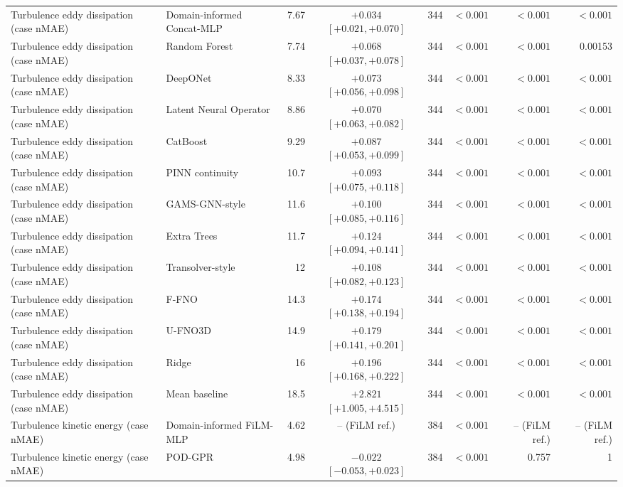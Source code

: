 \begin{landscape}
\begin{longtable}{p{4.0cm}p{3.4cm}rcrrrr}
Turbulence eddy dissipation (case nMAE) & Domain-informed Concat-MLP & 7.67 & $+0.034$ $[+0.021, +0.070]$ & 344 & $< 0.001$ & $< 0.001$ & $< 0.001$ \\
Turbulence eddy dissipation (case nMAE) & Random Forest & 7.74 & $+0.068$ $[+0.037, +0.078]$ & 344 & $< 0.001$ & $< 0.001$ & 0.00153 \\
Turbulence eddy dissipation (case nMAE) & DeepONet & 8.33 & $+0.073$ $[+0.056, +0.098]$ & 344 & $< 0.001$ & $< 0.001$ & $< 0.001$ \\
Turbulence eddy dissipation (case nMAE) & Latent Neural Operator & 8.86 & $+0.070$ $[+0.063, +0.082]$ & 344 & $< 0.001$ & $< 0.001$ & $< 0.001$ \\
Turbulence eddy dissipation (case nMAE) & CatBoost & 9.29 & $+0.087$ $[+0.053, +0.099]$ & 344 & $< 0.001$ & $< 0.001$ & $< 0.001$ \\
Turbulence eddy dissipation (case nMAE) & PINN continuity & 10.7 & $+0.093$ $[+0.075, +0.118]$ & 344 & $< 0.001$ & $< 0.001$ & $< 0.001$ \\
Turbulence eddy dissipation (case nMAE) & GAMS-GNN-style & 11.6 & $+0.100$ $[+0.085, +0.116]$ & 344 & $< 0.001$ & $< 0.001$ & $< 0.001$ \\
Turbulence eddy dissipation (case nMAE) & Extra Trees & 11.7 & $+0.124$ $[+0.094, +0.141]$ & 344 & $< 0.001$ & $< 0.001$ & $< 0.001$ \\
Turbulence eddy dissipation (case nMAE) & Transolver-style & 12 & $+0.108$ $[+0.082, +0.123]$ & 344 & $< 0.001$ & $< 0.001$ & $< 0.001$ \\
Turbulence eddy dissipation (case nMAE) & F-FNO & 14.3 & $+0.174$ $[+0.138, +0.194]$ & 344 & $< 0.001$ & $< 0.001$ & $< 0.001$ \\
Turbulence eddy dissipation (case nMAE) & U-FNO3D & 14.9 & $+0.179$ $[+0.141, +0.201]$ & 344 & $< 0.001$ & $< 0.001$ & $< 0.001$ \\
Turbulence eddy dissipation (case nMAE) & Ridge & 16 & $+0.196$ $[+0.168, +0.222]$ & 344 & $< 0.001$ & $< 0.001$ & $< 0.001$ \\
Turbulence eddy dissipation (case nMAE) & Mean baseline & 18.5 & $+2.821$ $[+1.005, +4.515]$ & 344 & $< 0.001$ & $< 0.001$ & $< 0.001$ \\
Turbulence kinetic energy (case nMAE) & Domain-informed FiLM-MLP & 4.62 & -- (FiLM ref.) & 384 & $< 0.001$ & -- (FiLM ref.) & -- (FiLM ref.) \\
Turbulence kinetic energy (case nMAE) & POD-GPR & 4.98 & $-0.022$ $[-0.053, +0.023]$ & 384 & $< 0.001$ & 0.757 & 1 \\

\end{longtable}
\end{landscape}
